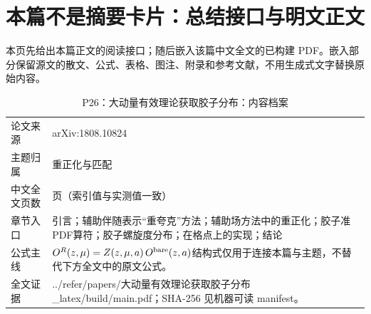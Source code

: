 \documentclass[UTF8,11pt,oneside]{ctexbook}
\begin{document}
\section*{本篇不是摘要卡片：总结接口与明文正文}
本页先给出本篇正文的阅读接口；随后嵌入该篇中文全文的已构建 PDF。嵌入部分保留源文的散文、公式、表格、图注、附录和参考文献，不用生成式文字替换原始内容。
\begin{table}[htbp]
  \centering
  \caption{P26：大动量有效理论获取胶子分布：内容档案}
  \small
  \begin{tabularx}{0.96\textwidth}{@{}p{3.3cm}>{\raggedright\arraybackslash}X@{}}
    \toprule
    论文来源 & arXiv:1808.10824 \\
    主题归属 & 重正化与匹配 \\
    中文全文页数 & 7 页（索引值与实测值一致） \\
    章节入口 & 引言；辅助伴随表示“重夸克”方法；辅助场方法中的重正化；胶子准PDF算符；胶子螺旋度分布；在格点上的实现；结论 \\
    公式主线 & $O^{R}(z,\mu)=Z(z,\mu,a)\,O^{\rm bare}(z,a)$\newline\scriptsize 结构式仅用于连接本篇与主题，不替代下方全文中的原文公式。 \\
    全文证据 & ../\allowbreak{}refer/\allowbreak{}papers/\allowbreak{}大动量有效理论获取胶子分布\_\allowbreak{}latex/\allowbreak{}build/\allowbreak{}main.pdf；SHA-256 见机器可读 manifest。 \\
    \bottomrule
  \end{tabularx}
\end{table}
\end{document}
